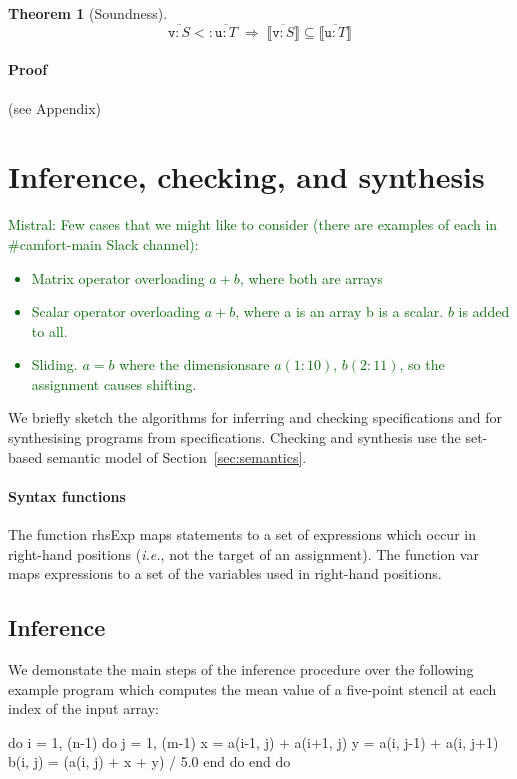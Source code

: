 \documentclass[9pt]{sigplanconf}
\newcommand{\mnote}[1]{\textcolor{darkgreen}{Mistral: #1}}
\newcounter{block}
\theoremstyle{definition}
\newtheorem{theorem}[block]{Theorem}
\newcommand{\ie}{\emph{i.e.}}
\newcommand{\interp}[1]{\llbracket{#1}\rrbracket}
\newcommand{\rhsExp}{\textsf{rhsExp}}
\newcommand{\var}{\textsf{var}}
\begin{document}
\begin{theorem}[Soundness]
\[
\overline{\texttt{v} : S} <: \overline{\texttt{u} : T}
\; \Rightarrow \;
\interp{\overline{\texttt{v} : S}} \subseteq \interp{\overline{\texttt{u} : T}}
\]
\end{theorem}

\paragraph{Proof} (see Appendix)



\section{Inference, checking, and synthesis}
\label{sec:analysis}

\mnote{Few cases that we might like to consider (there are examples
    of each in \#camfort-main Slack channel):
  \begin{itemize}
    \item Matrix operator overloading $a + b$, where both are arrays
    \item Scalar operator overloading $a + b$, where a is an array b is a
      scalar. $b$ is added to all.
    \item Sliding. $a = b$ where the dimensionsare $a(1:10)$, $b(2:11)$,
      so the assignment causes shifting.
  \end{itemize}
}

\noindent
We briefly sketch the algorithms for inferring and checking
specifications and for synthesising programs from specifications.
Checking and synthesis use the set-based semantic model of
Section~\ref{sec:semantics}. 

\paragraph{Syntax functions}
The function \rhsExp{} maps statements to a
set of expressions which occur in right-hand positions (\ie{}, not the
target of an assignment). The function \var{} maps expressions to a
set of the variables used in right-hand positions.

\subsection{Inference}

We demonstate the main steps of the inference procedure over the
following example program which computes the mean value 
of a five-point stencil at each index of the input array:
\begin{ExmVerbatim}
do i = 1, (n-1)
   do j = 1, (m-1)
      x       = a(i-1, j) + a(i+1, j) 
      y       = a(i, j-1) + a(i, j+1)
      b(i, j) = (a(i, j) + x + y) / 5.0
   end do
end do
\end{ExmVerbatim}
\end{document}
